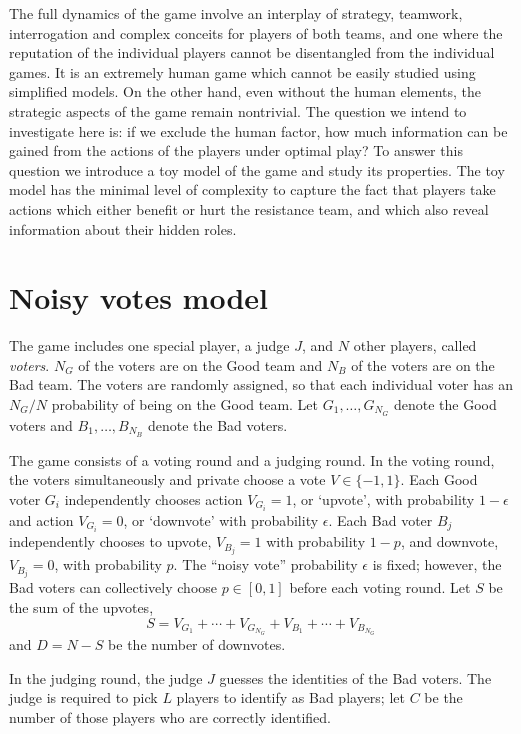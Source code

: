 \documentclass[11pt]{article}
\begin{document}
The full dynamics of the game involve an interplay of strategy,
teamwork, interrogation and complex conceits for players of both
teams, and one where the reputation of the individual players cannot
be disentangled from the individual games.  It is an extremely human
game which cannot be easily studied using simplified models.  On the
other hand, even without the human elements, the strategic aspects of
the game remain nontrivial.  The question we intend to investigate
here is: if we exclude the human factor, how much information can be
gained from the actions of the players under optimal play?  To answer
this question we introduce a toy model of the game and study its
properties.  The toy model has the minimal level of complexity to
capture the fact that players take actions which either benefit or
hurt the resistance team, and which also reveal information about
their hidden roles.

\section{Noisy votes model}

The game includes one special player, a judge $J$, and $N$ other
players, called \emph{voters}.  $N_G$ of the voters are on the Good
team and $N_B$ of the voters are on the Bad team.  The voters are
randomly assigned, so that each individual voter has an $N_G/N$
probability of being on the Good team.  Let $G_1,\hdots, G_{N_G}$
denote the Good voters and $B_1,\hdots,B_{N_B}$ denote the Bad voters.

The game consists of a voting round and a judging round.  In the
voting round, the voters simultaneously and private choose a vote $V
\in \{-1, 1\}$. Each Good voter $G_i$ independently chooses action
$V_{G_i}=1$, or `upvote', with probability $1-\epsilon$ and action
$V_{G_i}=0$, or `downvote' with probability $\epsilon$.  Each Bad
voter $B_j$ independently chooses to upvote, $V_{B_j}=1$ with
probability $1-p$, and downvote, $V_{B_j}=0$, with probability $p$.
The ``noisy vote'' probability $\epsilon$ is fixed; however, the Bad
voters can collectively choose $p \in [0,1]$ before each voting round.
Let $S$ be the sum of the upvotes,
\[
S =V_{G_1} + \cdots + V_{G_{N_G}} + V_{B_1} + \cdots + V_{B_{N_G}}
\]
and $D = N-S$ be the number of downvotes.

In the judging round, the judge $J$ guesses the identities of the Bad
voters.  The judge is required to pick $L$ players to identify as
Bad players; let $C$ be the number of those players who are correctly
identified.
\end{document}
